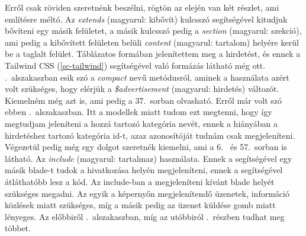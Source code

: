 \documentclass[]{thesis-ekf}
\theoremstyle{definition}
\theoremstyle{remark}
\begin{document}
		Erről csak röviden szeretnénk beszélni, rögtön az elején van két részlet, ami említésre méltó. Az \emph{extends} (magyarul: kibővít) kulcsszó segítségével kitudjuk bővíteni egy másik felületet, a másik kulcsszó pedig a \emph{section} (magyarul: szekció), ami pedig a kibővített felületen belüli \emph{content} (magyarul: tartalom) helyére kerül be a taglalt felület. Táblázatos formában jelenítettem meg a hirdetést, és ennek a Tailwind CSS (\ref{sc-tailwind}) segítségével való formázás látható még ott. .~alszakaszban esik szó a \emph{compact} nevű metódusról, aminek a használata azért volt szükséges, hogy elérjük a \emph{\$advertisement} (magyarul: hirdetés) változót. Kiemelném még azt is, ami pedig a 37.~sorban olvasható. Erről már volt szó ebben .~alszakaszban. Itt a modellek miatt tudom ezt megtenni, hogy így megtudjam jeleníteni a hozzá tartozó kategória nevét, ennek a hiányában a hirdetéshez tartozó kategória id-t, azaz azonosítóját tudnám csak megjeleníteni. Végezetül pedig még egy dolgot szeretnék kiemelni, ami a 6.~ és 57.~sorban is látható. Az \emph{include} (magyarul: tartalmaz) használata. Ennek a segítségével egy másik blade-t tudok a hivatkozása helyén megjeleníteni, ennek a segítségével átláthatóbb lesz a kód. Az include-ban a megjeleníteni kívánt blade helyét szükséges megadni. Az egyik a képernyőn megjelenítendő üzenetek, információ közlések miatt szükséges, míg a másik pedig az üzenet küldése gomb miatt lényeges. Az előbbiről .~alszakaszban, míg az utóbbiról .~részben tudhat meg többet.
\end{document}
